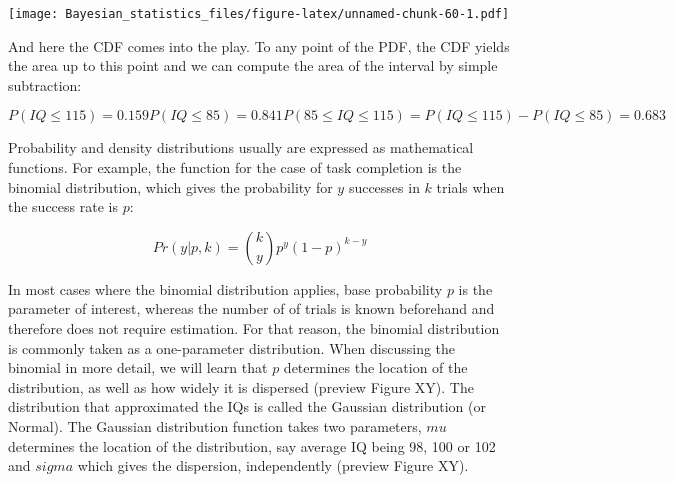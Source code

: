 \documentclass[]{svmono}
\newenvironment{Shaded}{\begin{snugshade}}{\end{snugshade}}
\newcommand{\KeywordTok}[1]{\textcolor[rgb]{0.13,0.29,0.53}{\textbf{#1}}}
\newcommand{\DataTypeTok}[1]{\textcolor[rgb]{0.13,0.29,0.53}{#1}}
\newcommand{\DecValTok}[1]{\textcolor[rgb]{0.00,0.00,0.81}{#1}}
\newcommand{\StringTok}[1]{\textcolor[rgb]{0.31,0.60,0.02}{#1}}
\newcommand{\OperatorTok}[1]{\textcolor[rgb]{0.81,0.36,0.00}{\textbf{#1}}}
\newcommand{\NormalTok}[1]{#1}
\theoremstyle{definition}
\theoremstyle{definition}
\theoremstyle{definition}
\theoremstyle{remark}
\begin{document}
\begin{Shaded}
\end{Shaded}

\texttt{[image: Bayesian\_statistics\_files/figure-latex/unnamed-chunk-60-1.pdf]}

And here the CDF comes into the play. To any point of the PDF, the CDF
yields the area up to this point and we can compute the area of the
interval by simple subtraction:

\[
P(IQ \leq 115) = 0.159
P(IQ \leq 85) = 0.841
P(85 \leq IQ \leq 115) = P(IQ \leq 115) - P(IQ \leq 85) = 0.683
\]

Probability and density distributions usually are expressed as
mathematical functions. For example, the function for the case of task
completion is the binomial distribution, which gives the probability for
\(y\) successes in \(k\) trials when the success rate is \(p\):

\[
Pr(y|p,k) = {k  \choose y}p^y(1-p)^{k-y}
\]

In most cases where the binomial distribution applies, base probability
\(p\) is the parameter of interest, whereas the number of of trials is
known beforehand and therefore does not require estimation. For that
reason, the binomial distribution is commonly taken as a one-parameter
distribution. When discussing the binomial in more detail, we will learn
that \(p\) determines the location of the distribution, as well as how
widely it is dispersed (preview Figure XY). The distribution that
approximated the IQs is called the Gaussian distribution (or Normal).
The Gaussian distribution function takes two parameters, \(mu\)
determines the location of the distribution, say average IQ being 98,
100 or 102 and \(sigma\) which gives the dispersion, independently
(preview Figure XY).
\end{document}
